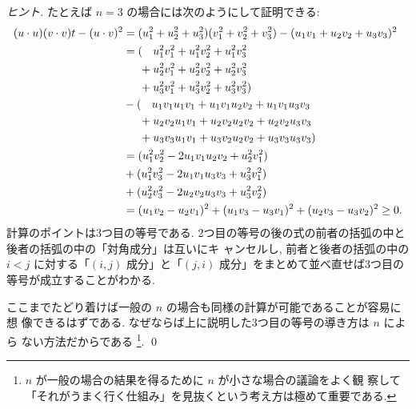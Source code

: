 \documentclass[12pt,twoside]{jarticle}
\begin{document}
\begin{proof}[ヒント]
  たとえば $n=3$ の場合には次のようにして証明できる:
  \begin{align*}
    (u\cdot u)(v\cdot v)t - (u\cdot v)^2
    &
    = (u_1^2+u_2^2+u_3^2)(v_1^2+v_2^2+v_3^2) - (u_1v_1 + u_2v_2 + u_3v_3)^2
    \\ &
    = ( \hphantom{+\,}
      u_1^2v_1^2 + u_1^2v_2^2 + u_1^2v_3^2
    \\ &
    \hphantom{= (}
    + u_2^2v_1^2 + u_2^2v_2^2 + u_2^2v_3^2
    \\ &
    \hphantom{= (}
    + u_3^2v_1^2 + u_3^2v_2^2 + u_3^2v_3^2
    ) 
    \\ &
    - ( \hphantom{+\,}
      u_1v_1u_1v_1 + u_1v_1u_2v_2 + u_1v_1u_3v_3
    \\ &
    \hphantom{= (}
    + u_2v_2u_1v_1 + u_2v_2u_2v_2 + u_2v_2u_3v_3
    \\ &
    \hphantom{= (} 
    + u_3v_3u_1v_1 + u_3v_2u_2v_2 + u_3v_3u_3v_3
    ) 
    \\ &
    = (u_1^2v_2^2 - 2u_1v_1u_2v_2 + u_2^2v_1^2)
    \\ &
    + (u_1^2v_3^2 - 2u_1v_1u_3v_3 + u_3^2v_1^2)
    \\ &
    + (u_2^2v_3^2 - 2u_2v_2u_3v_3 + u_3^2v_2^2)
    \\ &
    = (u_1v_2 - u_2v_1)^2
    + (u_1v_3 - u_3v_1)^2
    + (u_2v_3 - u_3v_2)^2
    \ge 0.
  \end{align*}
  計算のポイントは3つ目の等号である.
  2つ目の等号の後の式の前者の括弧の中と後者の括弧の中の「対角成分」は互いにキ
  ャンセルし, 前者と後者の括弧の中の $i<j$ に対する「$(i,j)$ 成分」と「$(j,i)$ 
  成分」をまとめて並べ直せば3つ目の等号が成立することがわかる.
  
  ここまでたどり着けば一般の $n$ の場合も同様の計算が可能であることが容易に想
  像できるはずである. なぜならば上に説明した3つ目の等号の導き方は $n$ によら
  ない方法だからである%
  \footnote{$n$ が一般の場合の結果を得るために $n$ が小さな場合の議論をよく観
    察して「それがうまく行く仕組み」を見抜くという考え方は極めて重要である.}.
  \qed
\end{proof}

\end{document}
